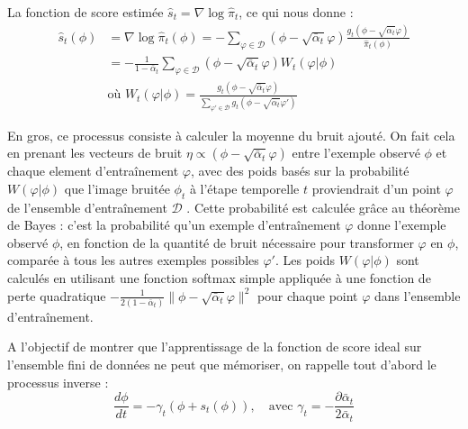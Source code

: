 \documentclass[a4paper,10pt]{article}
\theoremstyle{definition} %
\theoremstyle{definition} %
\theoremstyle{definition} %
\theoremstyle{definition} %
\begin{document}
La fonction de score estimée $\hat{s}_t = \nabla \log \hat{\pi}_t$, ce qui nous donne :
\begin{align*}
\hat{s}_t(\phi) &= \nabla \log \hat{\pi}_t(\phi) = -\sum\limits_{\varphi \in \mathcal{D}} (\phi - \sqrt{\bar \alpha_t}\varphi) \frac{g_t(\phi - \sqrt{\bar \alpha_t}\varphi)}{\hat{\pi}_t(\phi)} \\
&= -\frac{1}{1-\bar \alpha_t} \sum\limits_{\varphi \in \mathcal{D}} (\phi - \sqrt{\bar \alpha_t}\varphi) W_t(\varphi | \phi) \\
& \text{où }W_t(\varphi | \phi) = \frac{g_t(\phi - \sqrt{ \bar \alpha_t}\varphi)}{\sum\limits_{\varphi' \in \mathcal{D}} g_t(\phi - \sqrt{\bar \alpha_t}\varphi')}
\end{align*}


En gros, ce processus consiste à calculer la moyenne du bruit ajouté. On fait cela en prenant les vecteurs de bruit $\eta \propto (\phi - \sqrt{\bar \alpha_t}\varphi)$ entre l'exemple observé $\phi$ et chaque element d'entraînement $\varphi$, avec des poids basés sur  la probabilité $W(\varphi|\phi)$ que l'image bruitée $\phi_t$ à l'étape temporelle $t$ proviendrait d'un point $\varphi$ de l'ensemble d'entraînement $\mathcal{D}$ . Cette probabilité est calculée grâce au théorème de Bayes : c'est la probabilité qu'un exemple d'entraînement $\varphi$ donne l'exemple observé $\phi$, en fonction de la quantité de bruit nécessaire pour transformer $\varphi$ en $\phi$, comparée à tous les autres exemples possibles $\varphi'$. Les poids $W(\varphi|\phi)$ sont calculés en utilisant une fonction softmax simple appliquée à une fonction de perte quadratique $-\frac{1}{2(1-\bar \alpha_t)}\|\phi - \sqrt{\bar \alpha_t}\varphi\|^2$ pour chaque point $\varphi$ dans l'ensemble d'entraînement.

A l'objectif de montrer que l'apprentissage de la fonction de score ideal sur l'ensemble fini de données ne peut que mémoriser, on rappelle tout d'abord le processus inverse :
\begin{equation*}
    \frac{d\phi}{dt} =  -\gamma_t(\phi+s_t(\phi)), \quad \text{avec } \gamma_t = -\frac{\partial \bar \alpha_t}{2\bar \alpha_t} 
\end{equation*}

\end{document}
